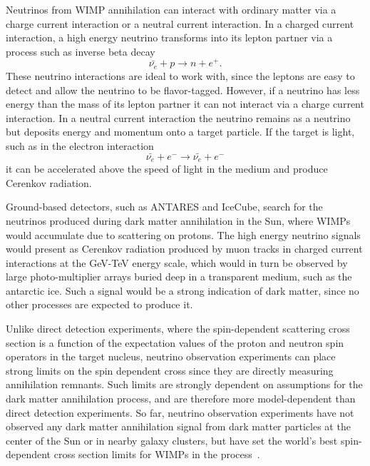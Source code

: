 Neutrinos from WIMP annihilation can interact with ordinary matter via a charge current interaction or a neutral current interaction.  In a charged current interaction, a high energy neutrino transforms into its lepton partner via a process such as inverse beta decay
\begin{equation}
\bar{\nu_e} + p \rightarrow n + e^+ .
\end{equation}
These neutrino interactions are ideal to work with, since the leptons are easy to detect and allow the neutrino to be flavor-tagged.  However, if a neutrino has less energy than the mass of its lepton partner it can not interact via a charge current interaction.  In a neutral current interaction the neutrino remains as a neutrino but deposits energy and momentum onto a target particle.  If the target is light, such as in the electron interaction
\begin{equation}
\bar{\nu_e} + e^- \rightarrow \bar{\nu_e} + e^- 
\end{equation}
it can be accelerated above the speed of light in the medium and produce Cerenkov radiation.  

Ground-based detectors, such as ANTARES and IceCube, search for the neutrinos produced during dark matter annihilation in the Sun, where WIMPs would accumulate due to scattering on protons.  The high energy neutrino signals would present as Cerenkov radiation produced by muon tracks in charged current interactions at the GeV-TeV energy scale, which would in turn be observed by large photo-multiplier arrays buried deep in a transparent medium, such as the antarctic ice.  Such a signal would be a strong indication of dark matter, since no other processes are expected to produce it.  

Unlike direct detection experiments, where the spin-dependent scattering cross section is a function of the  expectation values of the proton and neutron spin operators in the target nucleus, neutrino observation experiments can place strong limits on the spin dependent cross since they are directly measuring annihilation remnants.  Such limits are strongly dependent on assumptions for the dark matter annihilation process, and are therefore more model-dependent than direct detection experiments.  So far, neutrino observation experiments have not observed any dark matter annihilation signal from dark matter particles at the center of the Sun or in nearby galaxy clusters, but have set the world's best spin-dependent cross section limits for WIMPs in the process~\cite{IceCube, IceCube2}.

